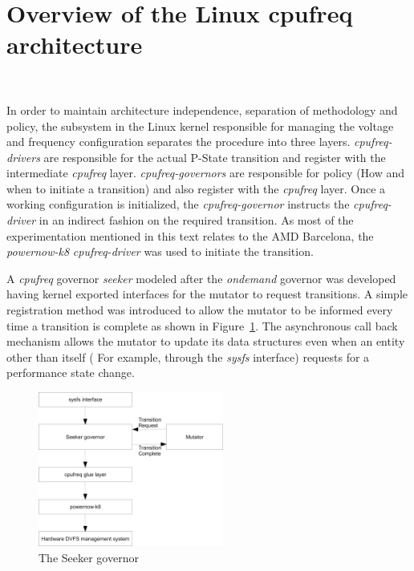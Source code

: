\section{Overview of the Linux cpufreq architecture}~\label{sec:cpufreq}

In order to maintain architecture independence, separation of methodology 
and policy, the subsystem in the Linux kernel responsible for managing the 
voltage and frequency configuration separates the procedure into three layers. \textit{cpufreq-drivers}
are responsible for the actual P-State transition and register with the 
intermediate \textit{cpufreq} layer. \textit{cpufreq-governors} are responsible for
policy (How and when to initiate a transition) and also register with the 
\textit{cpufreq} layer. Once a working configuration is initialized, the 
\textit{cpufreq-governor} instructs the \textit{cpufreq-driver} in an indirect
fashion on the required transition. As most of the experimentation mentioned in
this text relates to the AMD Barcelona, the \textit{powernow-k8} \textit{cpufreq-driver}
was used to initiate the transition. 

A \textit{cpufreq} governor \textit{seeker} modeled after the \textit{ondemand} governor
was developed having kernel exported interfaces for the mutator to request transitions. 
A simple registration method was introduced to allow the mutator to be informed 
every time a transition is complete as shown in Figure~\ref{fig:governor}. 
The asynchronous call back mechanism allows the mutator to
update its data structures even when an entity other than itself ( For example, through
the \textit{sysfs} interface) requests for a performance state change. 

\begin{figure}[h!]
  \begin{center}
    \includegraphics[height=2in]{figures/seeker_governor.jpg}%
    \caption{The Seeker governor}
    \label{fig:governor}
  \end{center}
\end{figure}


